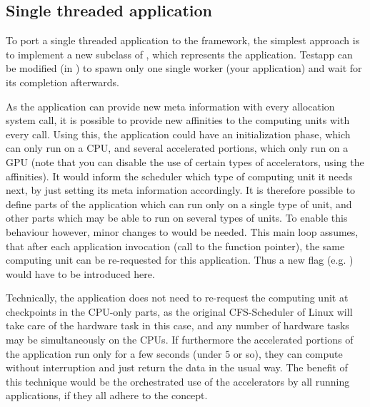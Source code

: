 \subsection{Single threaded application}
\label{Porting:STA}
To port a single threaded application to the framework, the simplest approach is to implement a new subclass of , which represents the application. Testapp can be modified (in ) to spawn only one single worker (your application) and wait for its completion afterwards.

As the application can provide new meta information with every allocation system call, it is possible to provide new affinities to the computing units with every call. Using this, the application could have an initialization phase, which can only run on a CPU, and several accelerated portions, which only run on a GPU (note that you can disable the use of certain types of accelerators, using the affinities). It would inform the scheduler which type of computing unit it needs next, by just setting its meta information accordingly. It is therefore possible to define parts of the application which can run only on a single type of unit, and other parts which may be able to run on several types of units. To enable this behaviour however, minor changes to  would be needed. This main loop assumes, that after each application invocation (call to the  function pointer), the same computing unit can be re-requested for this application. Thus a new flag (e.g. ) would have to be introduced here.

Technically, the application does not need to re-request the computing unit at checkpoints in the CPU-only parts, as the original CFS-Scheduler of Linux will take care of the hardware task in this case, and any number of hardware tasks may be simultaneously on the CPUs. If furthermore the accelerated portions of the application run only for a few seconds (under $5$ or so), they can compute without interruption and just return the data in the usual way. The benefit of this technique would be the orchestrated use of the accelerators by all running applications, if they all adhere to the concept.

